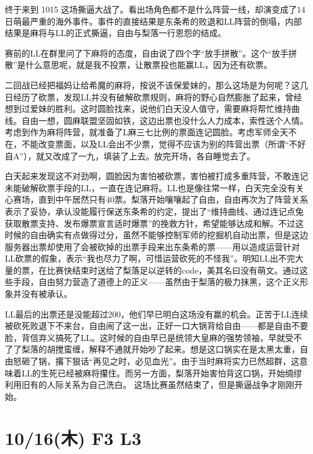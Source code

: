 终于来到 1015 这场撕逼大战了。看出场角色都不是什么阵营一线，却演变成了14日萌最严重的海外事件。事件的直接结果是东条希的败退和LL阵营的倒塌，内部结果是麻将与LL的正式撕逼，自由与梨落一行恩怨的结成。

赛前的LL在群里问了下麻将的态度，自由说了四个字“放手拼散”。这个“放手拼散”是什么意思呢，就是我不投票，让散票投也能赢LL，因为还有砍票。

二回战已经把福妈让给希魔的麻将，按说不该保爱妹的，那么这场是为何呢？这几日经历了砍票，发现LL并没有破解砍票规则，麻将的野心自然膨胀了起来，曾经想到过爱妹的胜利。这时圆脸找来，说他们白天没人值守，需要麻将帮忙维持曲线。自由一想，圆麻联盟坚固如铁，这边出票也没什么人力成本，索性送个人情。考虑到作为麻将阵营，就准备了L麻三七比例的票面连记圆脸。考虑军师全天不在，不能改变票面，以及LL会出不少票，觉得不应该为别的阵营出票（所谓“不好自A”），就又改成了一九，填装了上去。放完开场，各自睡觉去了。

白天起来发现这不对劲啊，圆脸因为害怕被砍票，害怕被打成多重阵营，不敢连记未能破解砍票手段的LL，一直在连记麻将。LL也是像往常一样，白天完全没有关心赛场，直到中午居然只有40票。梨落开始嚷嚷起了自由，自由再次为了阵营关系表示了妥协，承认没能履行保送东条希的约定，提出了“维持曲线、通过连记点兔获取散票支持、发布爆票宣言适时爆票”的挽救方针，希望能够达成和解。不过这时候的自由确实有点做得过分，虽然不能够控制军师的挖掘机自动出票，但是这边服务器出票却使用了会被砍掉的出票手段来出东条希的票——用以造成运营针对LL砍票的假象，表示“我也尽力了啊，可惜运营砍死的不怪我”。明知LL出不完大量的票，在比赛快结束时送给了梨落足以逆转的code，美其名曰没有萌文。通过这些手段，自由努力营造了道德上的正义——虽然由于梨落的极力抹黑，这个正义形象并没有被承认。

LL最后的出票还是没能超过200，他们早已明白这场没有赢的机会。正苦于LL连续被砍死败退下不来台，自由闹了这一出，正好一口大锅背给自由——都是自由不要脸，背信弃义搞死了LL。这时候的自由早已是统领大皇麻的强势领袖，早就受不了了梨落的胡搅蛮缠，解释不通就开始吵了起来。想是这口锅实在是太黑太重，自由怒砸了锅，撂下狠话“再见之时，必见血光”。由于当时麻将实力已然超群，这意味着LL的生死已经被麻将攥住。而另一方面，梨落开始害怕背这口锅，开始绸缪利用旧有的人际关系为自己洗白。
这场比赛虽然结束了，但是撕逼战争才刚刚开始。

\section{10/16(木) F3 L3}


